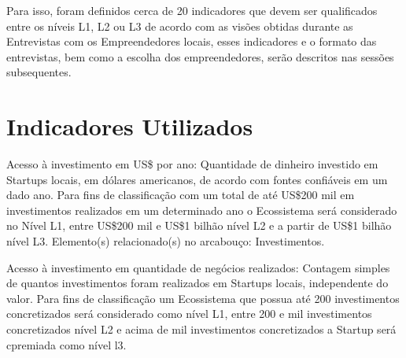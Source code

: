 Para isso, foram definidos cerca de 20 indicadores que devem ser qualificados entre os níveis L1, L2 ou L3 de acordo com as visões obtidas durante as Entrevistas com os Empreendedores locais, esses indicadores e o formato das entrevistas, bem como a escolha dos empreendedores, serão descritos nas sessões subsequentes. 

\section{Indicadores Utilizados}
\label{section:indicadores_utilizados}

\begin{description}
  \item Acesso à investimento em US\$ por ano: Quantidade de dinheiro investido em Startups locais, em dólares americanos, de acordo com fontes confiáveis em um dado ano. Para fins de classificação com um total de até US\$200 mil em investimentos realizados em um determinado ano o Ecossistema será considerado no Nível L1, entre US\$200 mil e US\$1 bilhão nível L2 e a partir de US\$1 bilhão nível L3. Elemento(s) relacionado(s) no arcabouço: Investimentos. 

  \item Acesso à investimento em quantidade de negócios realizados: Contagem simples de quantos investimentos foram realizados em Startups locais, independente do valor. Para fins de classificação um Ecossistema que possua até 200 investimentos concretizados será considerado como nível L1, entre 200 e mil investimentos concretizados nível L2 e acima de mil investimentos concretizados a Startup será cpremiada como nível l3.
  

\end{description}
